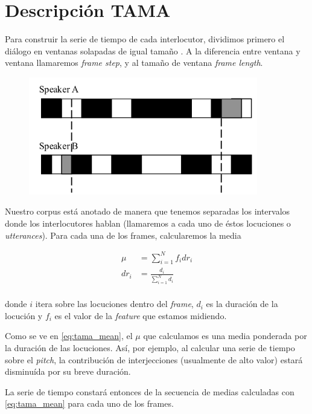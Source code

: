 \section{Descripción TAMA}


Para construir la serie de tiempo de cada interlocutor, dividimos primero el diálogo en ventanas solapadas de igual tamaño \cite{KOU2008}. A la diferencia entre ventana y ventana llamaremos \emph{frame step}, y al tamaño de ventana \emph{frame length}.

\begin{figure}
\centering
\includegraphics[width=10cm]{images/tama.png}

\end{figure}

Nuestro corpus está anotado de manera que tenemos separadas los intervalos donde los interlocutores hablan (llamaremos a cada uno de éstos locuciones o \emph{utterances}). Para cada una de los frames, calcularemos la media

\begin{align}
    \mu &= \sum\limits_{i=1}^N f_i dr_i \label{eq:tama_mean}\\
    dr_i &= \frac{d_i}{\sum\limits_{i=1}^N d_i} \\
\end{align}

donde $i$ itera sobre las locuciones dentro del \emph{frame}, $d_i$ es la duración de la locución y $f_i$ es el valor de la \emph{feature} que estamos midiendo.

Como se ve en \ref{eq:tama_mean}, el $\mu$ que calculamos es una media ponderada por la duración de las locuciones. Así, por ejemplo, al calcular una serie de tiempo sobre el \emph{pitch}, la contribución de interjecciones (usualmente de alto valor) estará disminuída por su breve duración.

La serie de tiempo constará entonces de la secuencia de medias calculadas con \ref{eq:tama_mean} para cada uno de los frames.


